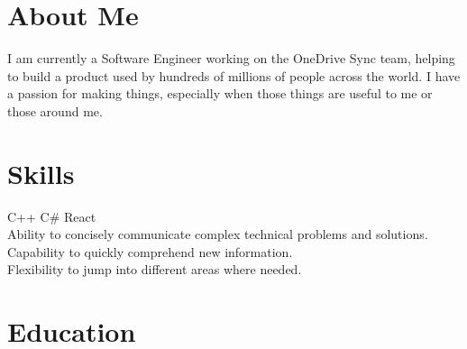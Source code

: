 \documentclass[letterpaper]{deedy-resume} %
\begin{document}
\begin{minipage}[t]{0.32\textwidth} %


\section{About Me}
I am currently a Software Engineer working on the OneDrive Sync team, helping to build a product used by hundreds of millions of people across the world. I have a passion for making things, especially when those things are useful to me or those around me.

\sectionspace


\section{Skills}
\raggedright
C++ \textbullet{} C\# \textbullet{} React\\
\vspace{0.5em}
Ability to concisely communicate complex technical problems and solutions.\\
\vspace{0.5em}
Capability to quickly comprehend new information.\\
\vspace{0.5em}
Flexibility to jump into different areas where needed.\\

\sectionspace %


\section{Education}


\end{minipage}
\end{document}
